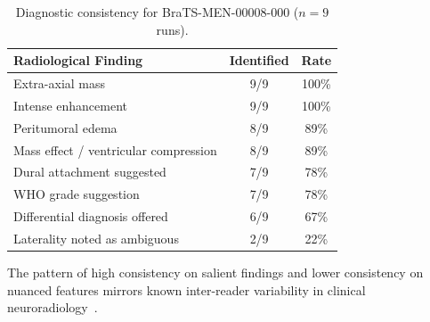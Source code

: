 \documentclass{article}
\begin{document}
	\begin{table}[h]
		\centering
		\caption{Diagnostic consistency for BraTS-MEN-00008-000 ($n=9$ runs).}
		\label{tab:consistency}
		\begin{tabular}{lcc}
			\toprule
			\textbf{Radiological Finding} & \textbf{Identified} & \textbf{Rate} \\
			\midrule
			Extra-axial mass                      & 9/9  & 100\% \\
			Intense enhancement                   & 9/9  & 100\% \\
			Peritumoral edema                     & 8/9  & 89\%  \\
			Mass effect / ventricular compression & 8/9  & 89\%  \\
			Dural attachment suggested            & 7/9  & 78\%  \\
			WHO grade suggestion                  & 7/9  & 78\%  \\
			Differential diagnosis offered        & 6/9  & 67\%  \\
			Laterality noted as ambiguous         & 2/9  & 22\%  \\
			\bottomrule
		\end{tabular}
	\end{table}
	
	The pattern of high consistency on salient findings and lower consistency
	on nuanced features mirrors known inter-reader variability in clinical
	neuroradiology~\citep{menze2015brats}.
	
\end{document}

